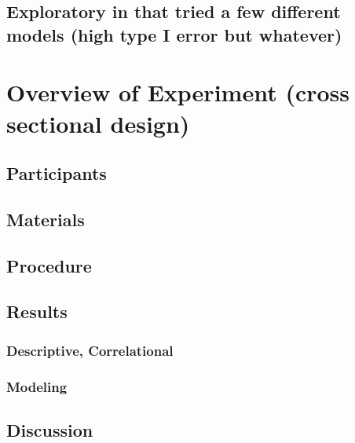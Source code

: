 \documentclass[]{book}
\theoremstyle{definition}
\theoremstyle{definition}
\theoremstyle{definition}
\theoremstyle{remark}
\begin{document}
\hypertarget{exploratory-in-that-tried-a-few-different-models-high-type-i-error-but-whatever}{%
\subsection{Exploratory in that tried a few different models (high type
I error but
whatever)}\label{exploratory-in-that-tried-a-few-different-models-high-type-i-error-but-whatever}}

\hypertarget{overview-of-experiment-cross-sectional-design}{%
\section{Overview of Experiment (cross sectional
design)}\label{overview-of-experiment-cross-sectional-design}}

\hypertarget{participants}{%
\subsection{Participants}\label{participants}}

\hypertarget{materials}{%
\subsection{Materials}\label{materials}}

\hypertarget{procedure}{%
\subsection{Procedure}\label{procedure}}

\hypertarget{results}{%
\subsection{Results}\label{results}}

\hypertarget{descriptive-correlational}{%
\subsubsection{Descriptive,
Correlational}\label{descriptive-correlational}}

\hypertarget{modeling}{%
\subsubsection{Modeling}\label{modeling}}

\hypertarget{discussion}{%
\subsection{Discussion}\label{discussion}}
\end{document}
